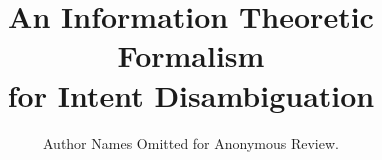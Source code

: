 \documentclass[conference]{IEEEtran}
\begin{document}
\title{An Information Theoretic Formalism \\for Intent Disambiguation}
\author{Author Names Omitted for Anonymous Review.}




% 
%	
%	
%	
%	

\maketitle
\end{document}

